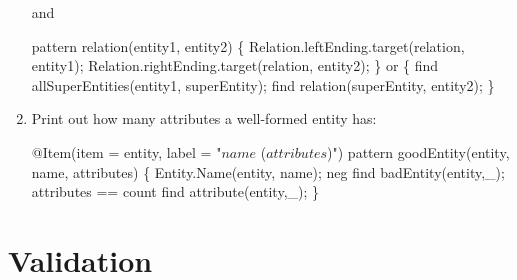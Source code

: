 \documentclass[]{report}
\newenvironment{Shaded}{}{}
\newcommand{\StringTok}[1]{\textcolor[rgb]{0.25,0.44,0.63}{{#1}}}
\newcommand{\FunctionTok}[1]{\textcolor[rgb]{0.02,0.16,0.49}{{#1}}}
\newcommand{\NormalTok}[1]{{#1}}
\begin{document}
\begin{enumerate}
  and

\begin{Shaded}
\begin{Highlighting}[]
\NormalTok{pattern }\FunctionTok{relation}\NormalTok{(entity1, entity2) \{}
    \NormalTok{Relation.}\FunctionTok{leftEnding}\NormalTok{.}\FunctionTok{target}\NormalTok{(relation, entity1);}
    \NormalTok{Relation.}\FunctionTok{rightEnding}\NormalTok{.}\FunctionTok{target}\NormalTok{(relation, entity2);}
\NormalTok{\} or \{}
    \NormalTok{find }\FunctionTok{allSuperEntities}\NormalTok{(entity1, superEntity);}
    \NormalTok{find }\FunctionTok{relation}\NormalTok{(superEntity, entity2);}
\NormalTok{\}}
\end{Highlighting}
\end{Shaded}
\item
  Print out how many attributes a well-formed entity has:

\begin{Shaded}
\begin{Highlighting}[]
\FunctionTok{@Item}\NormalTok{(item = entity, label = }\StringTok{"$name$ ($attributes$)"}\NormalTok{)}
\NormalTok{pattern }\FunctionTok{goodEntity}\NormalTok{(entity, name, attributes) \{}
    \NormalTok{Entity.}\FunctionTok{Name}\NormalTok{(entity, name);}
    \NormalTok{neg find }\FunctionTok{badEntity}\NormalTok{(entity,_);}
    \NormalTok{attributes == count find }\FunctionTok{attribute}\NormalTok{(entity,_);}
\NormalTok{\}}
\end{Highlighting}
\end{Shaded}
\end{enumerate}

\section{Validation}
\end{document}
